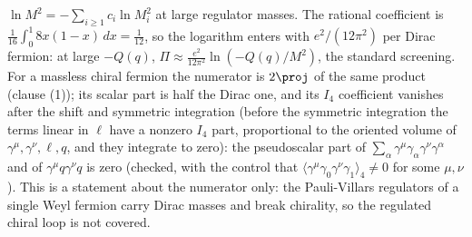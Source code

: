 $\ln M^{2} = -\sum_{i\geq1}c_{i}\ln M_{i}^{2}$ at large regulator masses. The rational coefficient is $\tfrac{1}{16}\int_{0}^{1}8x(1-x)\,dx = \tfrac{1}{12}$, so the logarithm enters with $e^{2}/(12\pi^{2})$ per Dirac fermion: at large $-Q(q)$, $\Pi \approx \tfrac{e^{2}}{12\pi^{2}}\ln(-Q(q)/M^{2})$, the standard screening. For a massless chiral fermion the numerator is $2\proj$ of the same product (clause (1)); its scalar part is half the Dirac one, and its $I_{4}$ coefficient vanishes after the shift and symmetric integration (before the symmetric integration the terms linear in $\ell$ have a nonzero $I_{4}$ part, proportional to the oriented volume of $\gamma^{\mu}, \gamma^{\nu}, \ell, q$, and they integrate to zero): the pseudoscalar part of $\sum_{\alpha}\gamma^{\mu}\gamma_{\alpha}\gamma^{\nu}\gamma^{\alpha}$ and of $\gamma^{\mu}q\gamma^{\nu}q$ is zero (checked, with the control that $\langle\gamma^{\mu}\gamma_{0}\gamma^{\nu}\gamma_{1}\rangle_{4} \neq 0$ for some $\mu, \nu$). This is a statement about the numerator only: the Pauli-Villars regulators of a single Weyl fermion carry Dirac masses and break chirality, so the regulated chiral loop is not covered.

